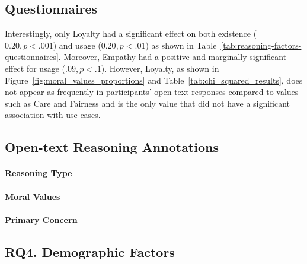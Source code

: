 \subsection{Questionnaires}
Interestingly, only Loyalty had a significant effect on both existence ($0.20, p<.001$) and usage ($0.20, p<.01$) as shown in Table~\ref{tab:reasoning-factors-questionnaires}. Moreover, Empathy had a positive and marginally significant effect for usage ($.09, p<.1$). However, Loyalty, as shown in Figure~\ref{fig:moral_values_proportions} and Table~\ref{tab:chi_squared_results}, does not appear as frequently in participants' open text responses compared to values such as Care and Fairness and is the only value that did not have a significant association with use cases. 





\subsection{Open-text Reasoning Annotations}
\paragraph{Reasoning Type}
\paragraph{Moral Values}
\paragraph{Primary Concern}

\subsection{RQ4. Demographic Factors}